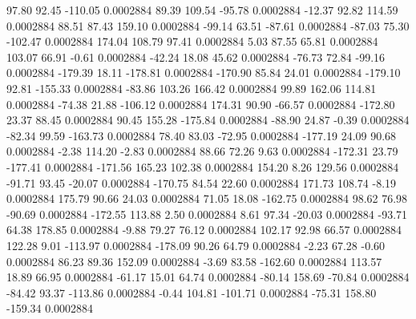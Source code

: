        97.80       92.45     -110.05     0.0002884
       89.39      109.54      -95.78     0.0002884
      -12.37       92.82      114.59     0.0002884
       88.51       87.43      159.10     0.0002884
      -99.14       63.51      -87.61     0.0002884
      -87.03       75.30     -102.47     0.0002884
      174.04      108.79       97.41     0.0002884
        5.03       87.55       65.81     0.0002884
      103.07       66.91       -0.61     0.0002884
      -42.24       18.08       45.62     0.0002884
      -76.73       72.84      -99.16     0.0002884
     -179.39       18.11     -178.81     0.0002884
     -170.90       85.84       24.01     0.0002884
     -179.10       92.81     -155.33     0.0002884
      -83.86      103.26      166.42     0.0002884
       99.89      162.06      114.81     0.0002884
      -74.38       21.88     -106.12     0.0002884
      174.31       90.90      -66.57     0.0002884
     -172.80       23.37       88.45     0.0002884
       90.45      155.28     -175.84     0.0002884
      -88.90       24.87       -0.39     0.0002884
      -82.34       99.59     -163.73     0.0002884
       78.40       83.03      -72.95     0.0002884
     -177.19       24.09       90.68     0.0002884
       -2.38      114.20       -2.83     0.0002884
       88.66       72.26        9.63     0.0002884
     -172.31       23.79     -177.41     0.0002884
     -171.56      165.23      102.38     0.0002884
      154.20        8.26      129.56     0.0002884
      -91.71       93.45      -20.07     0.0002884
     -170.75       84.54       22.60     0.0002884
      171.73      108.74       -8.19     0.0002884
      175.79       90.66       24.03     0.0002884
       71.05       18.08     -162.75     0.0002884
       98.62       76.98      -90.69     0.0002884
     -172.55      113.88        2.50     0.0002884
        8.61       97.34      -20.03     0.0002884
      -93.71       64.38      178.85     0.0002884
       -9.88       79.27       76.12     0.0002884
      102.17       92.98       66.57     0.0002884
      122.28        9.01     -113.97     0.0002884
     -178.09       90.26       64.79     0.0002884
       -2.23       67.28       -0.60     0.0002884
       86.23       89.36      152.09     0.0002884
       -3.69       83.58     -162.60     0.0002884
      113.57       18.89       66.95     0.0002884
      -61.17       15.01       64.74     0.0002884
      -80.14      158.69      -70.84     0.0002884
      -84.42       93.37     -113.86     0.0002884
       -0.44      104.81     -101.71     0.0002884
      -75.31      158.80     -159.34     0.0002884
